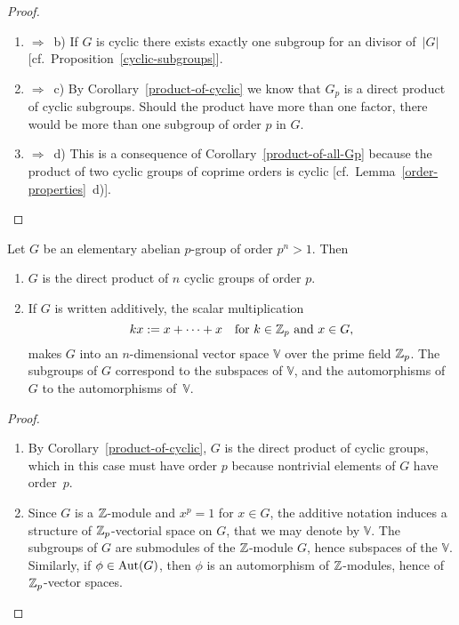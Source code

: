 \begin{proof}${}$
\begin{enumerate}[\rm a)]
    \item $\Rightarrow$~b) If $G$ is cyclic there exists exactly one subgroup for an divisor of~$|G|$ [cf.~Proposition~\ref{cyclic-subgroups}].

    \item $\Rightarrow$~c) By Corollary~\ref{product-of-cyclic} we know that $G_p$ is a direct product of cyclic subgroups. Should the product have more than one factor, there would be more than one subgroup of order $p$ in $G$.

    \item $\Rightarrow$~d) This is a consequence of Corollary~\ref{product-of-all-Gp} because the product of two cyclic groups of coprime orders is cyclic [cf.~Lemma~\ref{order-properties}~d)].
\end{enumerate}
\end{proof}

\begin{thm}
    Let\/ $G$ be an elementary abelian\/ $p$-group of order\/ $p^n > 1$. Then
    \begin{enumerate}[\rm a)]
    \item $G$ is the direct product of\/ $n$ cyclic groups of order\/ $p$.
    \item If\/ $G$ is written additively, the scalar multiplication
    $$
        kx := x + \cdots + x \quad \text{for } k \in \mathbb{Z}_p \text{ and } x \in G,
    $$
    makes\/ $G$ into an\/ $n$-dimensional vector space\/ $\mathbb V$ over the prime field\/ $\mathbb{Z}_p$. The subgroups of\/ $G$ correspond to the subspaces of\/ $\mathbb V$, and the automorphisms of\/ $G$ to the automorphisms of\/~$\mathbb V$.
    \end{enumerate}
\end{thm}

\begin{proof}${}$
\begin{enumerate}[\rm a)]
    \item By Corollary~\ref{product-of-cyclic}, $G$ is the direct product of cyclic groups, which in this case must have order $p$ because nontrivial elements of $G$ have order~$p$.

    \item Since $G$ is a $\mathbb{Z}$-module and $x^p=1$ for $x\in G$, the additive notation induces a structure of $\mathbb{Z}_p$-vectorial space on $G$, that we may denote by $\mathbb V$. The subgroups of $G$ are submodules of the $\mathbb{Z}$-module $G$, hence subspaces of the $\mathbb V$. Similarly, if $\phi\in{\rm Aut}(G)$, then $\phi$ is an automorphism of $\mathbb{Z}$-modules, hence of $\mathbb{Z}_p$-vector spaces.
\end{enumerate}
\end{proof}

